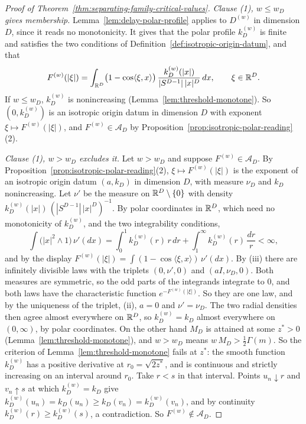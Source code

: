 \begin{proof}[Proof of Theorem~\ref{thm:separating-family-critical-values}]
\emph{Clause (1), $w \le w_D$ gives membership.} Lemma~\ref{lem:delay-polar-profile} applies to
$D^{(w)}$ in dimension $D$, since it reads no monotonicity. It gives that the polar profile
$k^{(w)}_D$ is finite and satisfies the two conditions of Definition~\ref{def:isotropic-origin-datum}, and
that
\[
  F^{(w)}(|\xi|) = \int_{\mathbb{R}^D}\bigl(1 - \cos\langle\xi,x\rangle\bigr)\,
     \frac{k^{(w)}_D(|x|)}{|S^{D-1}|\,|x|^D}\,dx , \qquad \xi \in \mathbb{R}^D .
\]
If $w \le w_D$, $k^{(w)}_D$ is nonincreasing (Lemma~\ref{lem:threshold-monotone}). So
$(0,k^{(w)}_D)$ is an isotropic origin datum in dimension $D$ with exponent
$\xi \mapsto F^{(w)}(|\xi|)$, and $F^{(w)} \in \mathcal{A}_D$ by
Proposition~\ref{prop:isotropic-polar-reading}(2).

\emph{Clause (1), $w > w_D$ excludes it.} Let $w > w_D$ and suppose
$F^{(w)} \in \mathcal{A}_D$. By Proposition~\ref{prop:isotropic-polar-reading}(2),
$\xi \mapsto F^{(w)}(|\xi|)$ is the exponent of an isotropic origin datum $(a,k_D)$ in dimension
$D$, with \Levy{} measure $\nu_D$ and $k_D$ nonincreasing. Let $\nu'$ be the measure on
$\mathbb{R}^D \setminus \{0\}$ with density $k^{(w)}_D(|x|)\,(|S^{D-1}|\,|x|^D)^{-1}$. By polar
coordinates in $\mathbb{R}^D$, which need no monotonicity of $k^{(w)}_D$, and the two integrability
conditions,
\[
  \int\bigl(|x|^2 \wedge 1\bigr)\,\nu'(dx)
   = \int_0^1 k^{(w)}_D(r)\,r\,dr + \int_1^\infty k^{(w)}_D(r)\,\frac{dr}{r} < \infty ,
\]
and by the display $F^{(w)}(|\xi|) = \int(1 - \cos\langle\xi,x\rangle)\,\nu'(dx)$. By
(iii) there are
infinitely divisible laws with the triplets $(0,\nu',0)$ and $(aI,\nu_D,0)$. Both \Levy{}
measures are symmetric, so the odd parts of the integrands integrate to $0$, and both laws have
the characteristic function $e^{-F^{(w)}(|\xi|)}$. So they are one law, and by the uniqueness
of the triplet, (ii), $a = 0$ and $\nu' = \nu_D$. The two radial densities then agree
almost everywhere on $\mathbb{R}^D$, so $k^{(w)}_D = k_D$ almost everywhere on $(0,\infty)$, by polar
coordinates. On the other hand $M_D$ is attained at some $z^* > 0$
(Lemma~\ref{lem:threshold-monotone}), and $w > w_D$ means $w\,M_D > \tfrac12\Gamma(m)$. So the
criterion of Lemma~\ref{lem:threshold-monotone} fails at $z^*$: the smooth function $k^{(w)}_D$ has a
positive derivative at $r_0 = \sqrt{2z^*}$, and is continuous and strictly increasing on an
interval around $r_0$. Take $r < s$ in that interval. Points $u_n \downarrow r$ and
$v_n \uparrow s$ at which $k^{(w)}_D = k_D$ give
$k^{(w)}_D(u_n) = k_D(u_n) \ge k_D(v_n) = k^{(w)}_D(v_n)$, and by continuity
$k^{(w)}_D(r) \ge k^{(w)}_D(s)$, a contradiction. So $F^{(w)} \notin \mathcal{A}_D$.


\end{proof}
